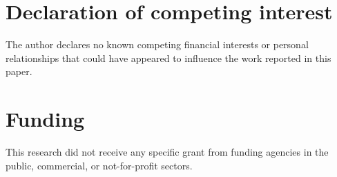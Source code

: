 \documentclass[preprint,12pt,authoryear]{elsarticle}
\begin{document}
\section*{Declaration of competing interest}

The author declares no known competing financial interests or personal relationships that could have appeared to influence the work reported in this paper.

\section*{Funding}

This research did not receive any specific grant from funding agencies in the public, commercial, or not-for-profit sectors.



\end{document}
